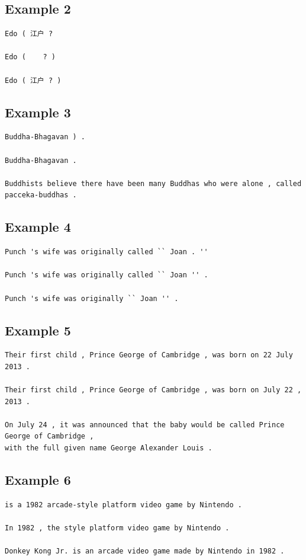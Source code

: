 \documentclass[11pt,twocolumn]{article}
\begin{document}
\subsection*{Example 2}
\label{app:2}
\begin{Verbatim}[fontsize=\scriptsize]
Edo ( 江户 ?

Edo (    ? )

Edo ( 江户 ? )
\end{Verbatim}

\subsection*{Example 3}
\label{app:3}
\begin{Verbatim}[fontsize=\scriptsize]
Buddha-Bhagavan ) .

Buddha-Bhagavan .

Buddhists believe there have been many Buddhas who were alone , called pacceka-buddhas .
\end{Verbatim}

\subsection*{Example 4}
\label{app:4}
\begin{Verbatim}[fontsize=\scriptsize]
Punch 's wife was originally called `` Joan . ''

Punch 's wife was originally called `` Joan '' .

Punch 's wife was originally `` Joan '' .
\end{Verbatim}

\subsection*{Example 5}
\label{app:5}
\begin{Verbatim}[fontsize=\scriptsize]
Their first child , Prince George of Cambridge , was born on 22 July 2013 .

Their first child , Prince George of Cambridge , was born on July 22 , 2013 .

On July 24 , it was announced that the baby would be called Prince George of Cambridge ,
with the full given name George Alexander Louis .
\end{Verbatim}

\subsection*{Example 6}
\label{app:6}
\begin{Verbatim}[fontsize=\scriptsize]
is a 1982 arcade-style platform video game by Nintendo .

In 1982 , the style platform video game by Nintendo .

Donkey Kong Jr. is an arcade video game made by Nintendo in 1982 .
\end{Verbatim}
\end{document}
